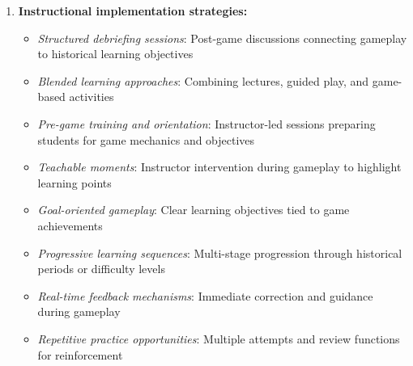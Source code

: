 \documentclass[a4paper,fleqn]{cas-sc}
\begin{document}
\begin{enumerate}[noitemsep]
\begin{itemize}[noitemsep]
 \item \textit{Self-regulated learning}: Student control over learning pace and path \citep{17Manzanares2019}
 
 \item \textit{Situated learning}: Learning embedded in authentic contexts and practices \citep{55Squire2004, 63Liu2021, 74Fendt2019, 78Rouse2022357, 80gottlieb2018your}
\end{itemize}

	\item 
\textbf{Instructional implementation strategies:}
\begin{itemize}[noitemsep]
 \item \textit{Structured debriefing sessions}: Post-game discussions connecting gameplay to historical learning objectives \citep{3Watson2011466, 29Stiso20201165, 58Shih2015173, 59Kee2014270, 71lynch2015pedagogical, 72hutauruk2020utilization}
 
 \item \textit{Blended learning approaches}: Combining lectures, guided play, and game-based activities \citep{8Yu2014, 40Kuran2018, 51Ardito2007, 70Hou201519}
 
 \item \textit{Pre-game training and orientation}: Instructor-led sessions preparing students for game mechanics and objectives \citep{8Yu2014, 59Kee2014270, 65Razak201139}
 
 \item \textit{Teachable moments}: Instructor intervention during gameplay to highlight learning points \citep{3Watson2011466}
 
 \item \textit{Goal-oriented gameplay}: Clear learning objectives tied to game achievements \citep{3Watson2011466, 8Yu2014, 51Ardito2007}
 
 \item \textit{Progressive learning sequences}: Multi-stage progression through historical periods or difficulty levels \citep{13Humpire2022, 18Shih201054, 28Chao201734, 40Kuran2018, 47Clara2010156, 70Hou201519}
 
 \item \textit{Real-time feedback mechanisms}: Immediate correction and guidance during gameplay \citep{1Barbatsis201159, 8Yu2014, 21Ghulamani2017, 40Kuran2018, 52Lin2011265, 55Squire2004, 62Milosz201896, 63Liu2021}
 
 \item \textit{Repetitive practice opportunities}: Multiple attempts and review functions for reinforcement \citep{55Squire2004}
 

\end{itemize}
\end{enumerate}
\end{document}
